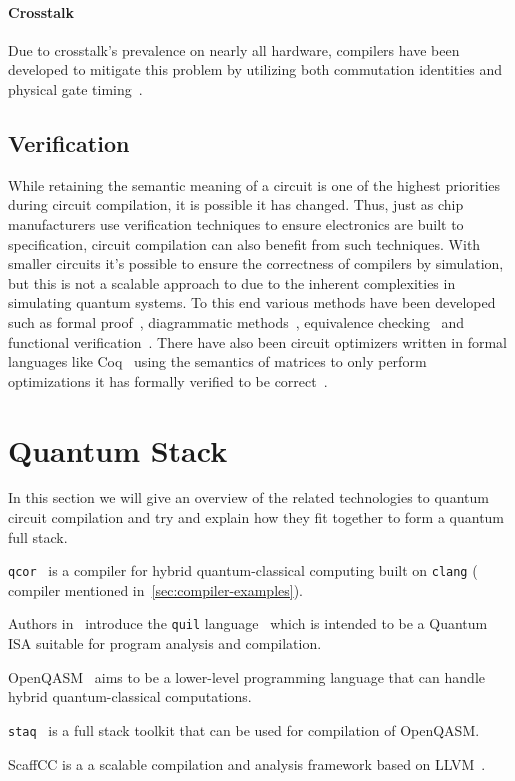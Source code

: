 \paragraph{Crosstalk}
Due to crosstalk's prevalence on nearly all hardware, compilers have been developed to mitigate this problem by utilizing both commutation identities and physical gate timing~\cite{crosstalk-commute,crosstalk-mitigation}. %

\subsection{Verification}

While retaining the semantic meaning of a circuit is one of the highest priorities during circuit compilation, it is possible it has changed.
Thus, just as chip manufacturers use verification techniques to ensure electronics are built to specification, circuit compilation can also benefit from such techniques.
With smaller circuits it's possible to ensure the correctness of compilers by simulation, but this is not a scalable approach to due to the inherent complexities in simulating quantum systems.
To this end various methods have been developed such as formal proof~\cite{circuit-verification-formal-proof}, diagrammatic methods~\cite{circuit-verification-diagrammatic}, equivalence checking~\cite{circuit-verification-equivalence-check} and functional verification~\cite{circuit-verification-functional}.
There have also been circuit optimizers written in formal languages like Coq~\cite{coq} using the semantics of matrices to only perform optimizations it has formally verified to be correct~\cite{verified-optimizer}.


\section{Quantum Stack}

In this section we will give an overview of the related technologies to quantum circuit compilation and try and explain how they fit together to form a quantum full stack.

\texttt{qcor}~\cite{qcor} is a \CPP{} compiler for hybrid quantum-classical computing built on \texttt{clang} (\CPP{} compiler mentioned in~\cref{sec:compiler-examples}).

Authors in~\cite{qisa} introduce the \texttt{quil} language~\cite{quil} which is intended to be a Quantum \ac{ISA} suitable for program analysis and compilation.

OpenQASM~\cite{openqasm2,openqasm3} aims to be a lower-level programming language that can handle hybrid quantum-classical computations.

\texttt{staq}~\cite{staq} is a full stack toolkit that can be used for compilation of OpenQASM.

ScaffCC is a a scalable compilation and analysis framework based on LLVM~\cite{scaffcc,scaffcc2}.
